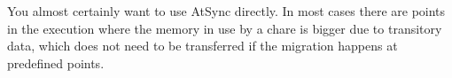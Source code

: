 You almost certainly want to use AtSync directly. In most cases there are
points in the execution where the memory in use by a chare is bigger due to
transitory data, which does not need to be transferred if the migration happens
at predefined points.


